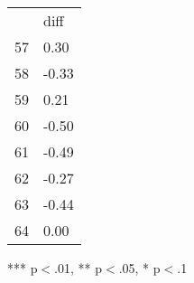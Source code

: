\documentclass{article}
\begin{document}
\begin{table}[!h]
\centering
\begin{tabular}{ll}
\cline{1-2}
\multicolumn{1}{|l}{} &
  \multicolumn{1}{|l|}{diff} \\
\cline{1-2}
\multicolumn{1}{|l}{57} &
  \multicolumn{1}{|l|}{0.30} \\
\cline{1-2}
\multicolumn{1}{|l}{58} &
  \multicolumn{1}{|l|}{-0.33} \\
\cline{1-2}
\multicolumn{1}{|l}{59} &
  \multicolumn{1}{|l|}{0.21} \\
\cline{1-2}
\multicolumn{1}{|l}{60} &
  \multicolumn{1}{|l|}{-0.50} \\
\cline{1-2}
\multicolumn{1}{|l}{61} &
  \multicolumn{1}{|l|}{-0.49} \\
\cline{1-2}
\multicolumn{1}{|l}{62} &
  \multicolumn{1}{|l|}{-0.27} \\
\cline{1-2}
\multicolumn{1}{|l}{63} &
  \multicolumn{1}{|l|}{-0.44} \\
\cline{1-2}
\multicolumn{1}{|l}{64} &
  \multicolumn{1}{|l|}{0.00} \\
\cline{1-2}
\end{tabular}

\footnotesize{
*** p$<$.01, ** p$<$.05, * p$<$.1
}
\end{table}
\end{document}
